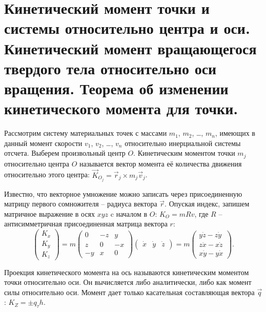 \chapter{Кинетический момент точки и системы относительно центра и оси.
Кинетический момент вращающегося твердого тела относительно оси вращения.
Теорема об изменении кинетического момента для точки.}

Рассмотрим систему материальных точек с массами \( m_1 \), \( m_2 \), \ldots,
\( m_n \), имеющих в данный момент скорости \( v_1 \), \( v_2 \), \ldots,
\( v_n \) относительно инерциальной системы отсчета. Выберем произвольный центр
\( O \). Кинетическим моментом точки \( m_j \) относительно центра \( O \)
называется вектор момента её количества движения относительно этого центра:
\( \vec{K}_{O_j} = \vec{r}_j \times m_j\vec{v}_j \).

Известно, что векторное умножение можно записать через присоединенную матрицу
первого сомножителя -- радиуса вектора \( \vec{r} \). Опуская индекс, запишем
матричное выражение в осях \( xyz \) c началом в \( O \): \( K_O = mRv \), где
\( R \) -- антисимметричная присоединенная матрица вектора \( r \):
\[
    \begin{pmatrix} K_x \\ K_y \\ K_z \end{pmatrix} =
    m\begin{pmatrix} 0 & -z & y \\ z & 0 & -x \\ -y & x & 0 \end{pmatrix}
    \begin{pmatrix} \dot{x} & \dot{y} & \dot{z} \end{pmatrix} = 
    m\begin{pmatrix} y\dot{z} - z\dot{y} \\ z\dot{x} - x\dot{z} \\
    x\dot{y} - y\dot{x} \end{pmatrix}.
\]
 
Проекция кинетического момента на ось называются кинетическим моментом точки
относительно оси. Он вычисляется либо аналитически, либо как момент силы
относительно оси. Момент дает только касательная составляющая вектора
\( \vec{q} \): \( K_Z = \pm q_\tau h \).

